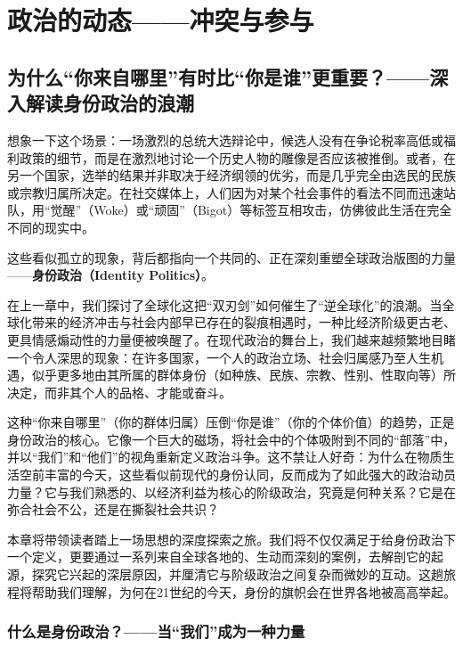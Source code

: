 \part{政治的动态——冲突与参与}

\chapter{为什么“你来自哪里”有时比“你是谁”更重要？——深入解读身份政治的浪潮}

想象一下这个场景：一场激烈的总统大选辩论中，候选人没有在争论税率高低或福利政策的细节，而是在激烈地讨论一个历史人物的雕像是否应该被推倒。或者，在另一个国家，选举的结果并非取决于经济纲领的优劣，而是几乎完全由选民的民族或宗教归属所决定。在社交媒体上，人们因为对某个社会事件的看法不同而迅速站队，用“觉醒”（Woke）或“顽固”（Bigot）等标签互相攻击，仿佛彼此生活在完全不同的现实中。

这些看似孤立的现象，背后都指向一个共同的、正在深刻重塑全球政治版图的力量——\textbf{身份政治（Identity Politics）}。

在上一章中，我们探讨了全球化这把“双刃剑”如何催生了“逆全球化”的浪潮。当全球化带来的经济冲击与社会内部早已存在的裂痕相遇时，一种比经济阶级更古老、更具情感煽动性的力量便被唤醒了。在现代政治的舞台上，我们越来越频繁地目睹一个令人深思的现象：在许多国家，一个人的政治立场、社会归属感乃至人生机遇，似乎更多地由其所属的群体身份（如种族、民族、宗教、性别、性取向等）所决定，而非其个人的品格、才能或奋斗。

这种“你来自哪里”（你的群体归属）压倒“你是谁”（你的个体价值）的趋势，正是身份政治的核心。它像一个巨大的磁场，将社会中的个体吸附到不同的“部落”中，并以“我们”和“他们”的视角重新定义政治斗争。这不禁让人好奇：为什么在物质生活空前丰富的今天，这些看似前现代的身份认同，反而成为了如此强大的政治动员力量？它与我们熟悉的、以经济利益为核心的阶级政治，究竟是何种关系？它是在弥合社会不公，还是在撕裂社会共识？

本章将带领读者踏上一场思想的深度探索之旅。我们将不仅仅满足于给身份政治下一个定义，更要通过一系列来自全球各地的、生动而深刻的案例，去解剖它的起源，探究它兴起的深层原因，并厘清它与阶级政治之间复杂而微妙的互动。这趟旅程将帮助我们理解，为何在21世纪的今天，身份的旗帜会在世界各地被高高举起。

\section{ 什么是身份政治？——当“我们”成为一种力量}

